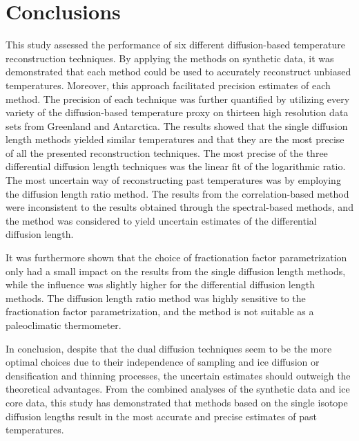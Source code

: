 \documentclass[11pt, draftcls, onecolumn]{IEEEtran} %
\numberwithin{equation}{section}
\numberwithin{table}{section}
\numberwithin{figure}{section}
\begin{document}
\section{Conclusions}  %
This study assessed the performance of six different diffusion-based temperature reconstruction
techniques.
By applying the methods on synthetic data, it was demonstrated that each method could be used to accurately reconstruct unbiased temperatures.
Moreover, this approach facilitated precision estimates of each method.
The precision of each technique was further quantified by
utilizing every variety of the diffusion-based temperature proxy on thirteen high resolution 
data sets from Greenland and Antarctica.
The results showed that the single diffusion length methods yielded similar temperatures
and that they are the most precise of all the presented reconstruction techniques.
The most precise of the three differential diffusion length techniques was the linear fit of
the logarithmic ratio.
The most uncertain way of reconstructing past temperatures was by employing the diffusion length ratio method.
The results from the correlation-based method were inconsistent to the results obtained through the spectral-based methods,
and the method was considered to yield uncertain estimates of the differential diffusion length.

It was furthermore shown that the choice of fractionation factor parametrization 
only had a small impact on the results from the single diffusion length methods, 
while the influence was slightly higher for the differential diffusion length methods.
The diffusion length ratio method was highly sensitive to the fractionation factor parametrization,
and the method is not suitable as a paleoclimatic thermometer. 

In conclusion, despite that the dual diffusion techniques seem to be the more optimal choices 
due to their independence of sampling and ice diffusion or densification and thinning processes,
the uncertain estimates should outweigh the theoretical advantages.
From the combined analyses of the synthetic data and ice core data, this study has demonstrated that methods 
based on the single isotope diffusion lengths result in the most accurate and precise estimates of past temperatures.	

\end{document}
